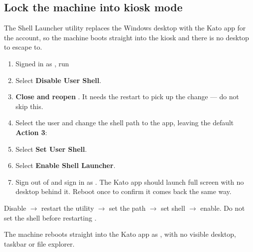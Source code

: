 \documentclass[a4paper,10pt]{article}
\begin{document}
\subsection{Lock the machine into kiosk mode}

The Shell Launcher utility replaces the Windows desktop with the Kato app
for the  account, so the machine boots straight into the
kiosk and there is no desktop to escape to.

\begin{enumerate}
  \item Signed in as , run\\

  \item Select \textbf{Disable User Shell}.

  \item \textbf{Close and reopen} . It needs the restart
        to pick up the change --- do not skip this.

  \item Select the  user and change the shell path to
        the app, leaving the default \textbf{Action 3}:\\

  \item Select \textbf{Set User Shell}.

  \item Select \textbf{Enable Shell Launcher}.

  \item Sign out of  and sign in as .
        The Kato app should launch full screen with no desktop behind it.
        Reboot once to confirm it comes back the same way.
\end{enumerate}

\begin{wkwarn}
Disable $\rightarrow$ restart the utility $\rightarrow$ set the path
$\rightarrow$ set shell $\rightarrow$ enable. Do not set the shell before
restarting .
\end{wkwarn}

\begin{wkinfo}
The machine reboots straight into the Kato app as , with
no visible desktop, taskbar or file explorer.
\end{wkinfo}
\end{document}
